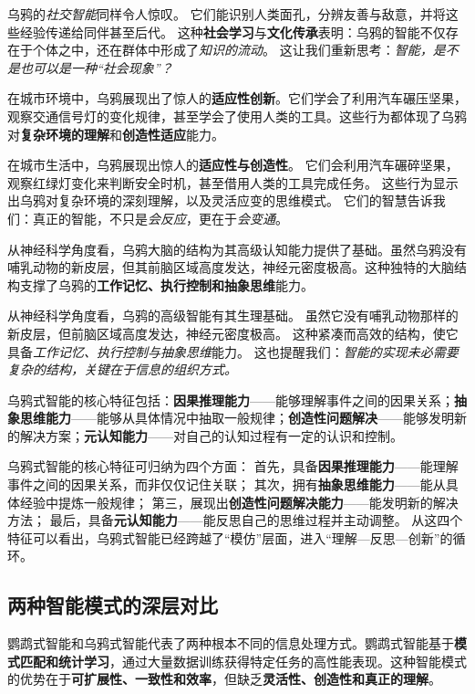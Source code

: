 乌鸦的\emph{社交智能}同样令人惊叹。
它们能识别人类面孔，分辨友善与敌意，并将这些经验传递给同伴甚至后代。
这种\textbf{社会学习}与\textbf{文化传承}表明：乌鸦的智能不仅存在于个体之中，还在群体中形成了\emph{知识的流动}。
这让我们重新思考：\emph{智能，是不是也可以是一种“社会现象”？}

在城市环境中，乌鸦展现出了惊人的\textbf{适应性创新}。它们学会了利用汽车碾压坚果，观察交通信号灯的变化规律，甚至学会了使用人类的工具。这些行为都体现了乌鸦对\textbf{复杂环境的理解}和\textbf{创造性适应}能力。

在城市生活中，乌鸦展现出惊人的\textbf{适应性与创造性}。
它们会利用汽车碾碎坚果，观察红绿灯变化来判断安全时机，甚至借用人类的工具完成任务。
这些行为显示出乌鸦对复杂环境的深刻理解，以及灵活应变的思维模式。
它们的智慧告诉我们：真正的智能，不只是\emph{会反应}，更在于\emph{会变通}。

从神经科学角度看，乌鸦大脑的结构为其高级认知能力提供了基础。虽然乌鸦没有哺乳动物的新皮层，但其前脑区域高度发达，神经元密度极高。这种独特的大脑结构支撑了乌鸦的\textbf{工作记忆、执行控制和抽象思维}能力。

从神经科学角度看，乌鸦的高级智能有其生理基础。
虽然它没有哺乳动物那样的新皮层，但前脑区域高度发达，神经元密度极高。
这种紧凑而高效的结构，使它具备\emph{工作记忆、执行控制与抽象思维}能力。
这也提醒我们：\emph{智能的实现未必需要复杂的结构，关键在于信息的组织方式。}

乌鸦式智能的核心特征包括：\textbf{因果推理能力}——能够理解事件之间的因果关系；\textbf{抽象思维能力}——能够从具体情况中抽取一般规律；\textbf{创造性问题解决}——能够发明新的解决方案；\textbf{元认知能力}——对自己的认知过程有一定的认识和控制。

乌鸦式智能的核心特征可归纳为四个方面：
首先，具备\textbf{因果推理能力}——能理解事件之间的因果关系，而非仅仅记住关联；
其次，拥有\textbf{抽象思维能力}——能从具体经验中提炼一般规律；
第三，展现出\textbf{创造性问题解决能力}——能发明新的解决方法；
最后，具备\textbf{元认知能力}——能反思自己的思维过程并主动调整。
从这四个特征可以看出，乌鸦式智能已经跨越了“模仿”层面，进入“理解—反思—创新”的循环。

\subsection{两种智能模式的深层对比}

鹦鹉式智能和乌鸦式智能代表了两种根本不同的信息处理方式。鹦鹉式智能基于\textbf{模式匹配和统计学习}，通过大量数据训练获得特定任务的高性能表现。这种智能模式的优势在于\textbf{可扩展性、一致性和效率}，但缺乏\textbf{灵活性、创造性和真正的理解}。

